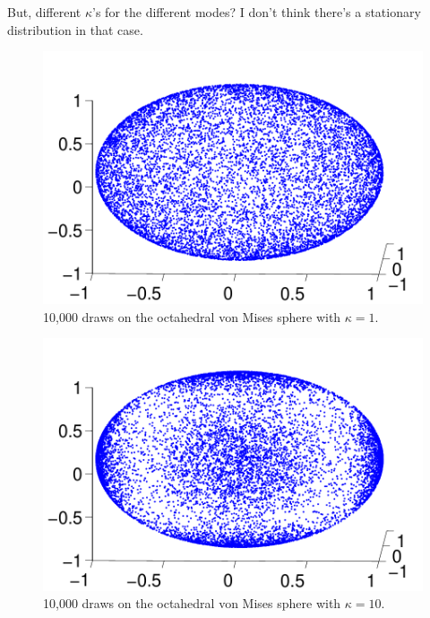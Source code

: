 \documentclass[11pt]{article}
\begin{document}
\noindent But, different $\kappa$'s for the different modes? I don't think there's a stationary distribution in that case.

\begin{figure}[h!]
\centering
\includegraphics[scale=0.35]{../fig/vm-draws__n_1e5__k_1.pdf}
\caption{10,000 draws on the octahedral von Mises sphere with $\kappa=1$.}
\label{fig:vm-draws__n_1e5__k_1}
\end{figure}

\begin{figure}[h!]
\centering
\includegraphics[scale=0.35]{../fig/vm-draws__n_1e5__k_10.pdf}
\caption{10,000 draws on the octahedral von Mises sphere with $\kappa=10$.}
\label{fig:vm-draws__n_1e5__k_10}
\end{figure}
\end{document}
